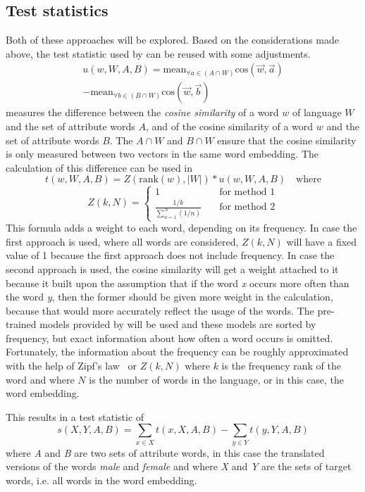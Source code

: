 \subsection{Test statistics}
Both of these approaches will be explored. Based on the considerations made above, the
test statistic used by
\textcite{caliskan_2017_semantics_language_corpora} can be reused with some adjustments. 
$$
\begin{aligned}
u(w,W,A,B) = \text{mean}_{\forall a \in (A \cap W)}\text{cos}(\overrightarrow{w}, \overrightarrow{a}) \\
- \text{mean}_{\forall b \in (B \cap W)}\text{cos}(\overrightarrow{w}, \overrightarrow{b})
\end{aligned}
$$
measures the difference between the \textit{cosine similarity} of a word $w$ of language $W$ and the set of attribute words $A$, and of the cosine similarity of a word $w$ and the
set of attribute words $B$. The $A \cap W$ and $B \cap W$ ensure that the cosine
similarity is only measured between two vectors in the same word embedding. The
calculation of this difference can be used in
$$
t(w,W,A,B) = Z(\text{rank}(w), |W|) * u(w,W,A,B)\quad\text{where}
$$
$$
Z(k,N) =
\begin{cases}
    1 & \quad \text{for method 1} \\
    \frac{1/k}{\displaystyle\sum_{n=1}^{N}(1/n)} & \quad \text{for method 2}
\end{cases}
$$
This formula adds a weight to each word, depending on its frequency.
In case the first approach is used, where all words are considered, $Z(k,N)$ will have a
fixed value of 1 because the first approach does not include frequency.
In case the second approach is used, the cosine similarity will get a weight attached
to it because it built upon the assumption that
if the word \textit{x} occurs more often than the word \textit{y}, then the former should
be given more weight in the calculation, because that would more accurately reflect the
usage of the words. The pre-trained models provided by \textcite{grave2018learning} will be
used and these models are sorted by frequency, but exact information about how often a
word occurs is omitted.
Fortunately, the information about the frequency can be roughly approximated with the
help of Zipf's law~\parencite{Zipf-1935, word_embedding_zipf_context} or $Z(k,N)$ where
$k$ is the frequency rank of the word and where $N$ is the number of words in the language,
or in this case, the word embedding.

This results in a test statistic of
$$
s(X,Y,A,B) = \displaystyle\sum_{x \in X}t(x,X,A,B) - \displaystyle\sum_{y \in Y}t(y,Y,A,B)
$$
where \textit{A} and \textit{B} are two sets of attribute words, in this case the
translated versions of the words \textit{male} and
\textit{female} and where \textit{X} and \textit{Y} are the sets of target words, i.e.
all words in the word embedding.

